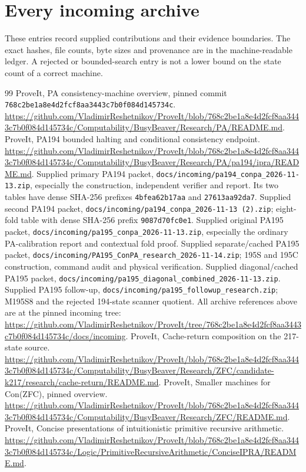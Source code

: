 \documentclass[11pt,letterpaper]{article}
\newcommand{\file}[1]{\texttt{\nolinkurl{#1}}}
\begin{document}
\clearpage

\label{app:guardreview}

\clearpage
\section{Every incoming archive}\label{app:ledger}
These entries record supplied contributions and their evidence boundaries.
The exact hashes, file counts, byte sizes and provenance are in the
machine-readable ledger. A rejected or bounded-search entry is not a
lower bound on the state count of a correct machine.
{\small}

\clearpage
\begin{thebibliography}{99}
 ProveIt, PA consistency-machine overview, pinned commit
\texttt{768c2be1a8e4d2fcf8aa3443c7b0f084d145734c}.
\url{https://github.com/VladimirReshetnikov/ProveIt/blob/768c2be1a8e4d2fcf8aa3443c7b0f084d145734c/Computability/BusyBeaver/Research/PA/README.md}.
 ProveIt, PA194 bounded halting and conditional consistency endpoint.
\url{https://github.com/VladimirReshetnikov/ProveIt/blob/768c2be1a8e4d2fcf8aa3443c7b0f084d145734c/Computability/BusyBeaver/Research/PA/pa194/ipra/README.md}.
 Supplied primary PA194 packet,
\file{docs/incoming/pa194_conpa_2026-11-13.zip}, especially the construction,
independent verifier and report. Its two tables have dense SHA-256 prefixes
\texttt{4bfea62b17aa} and \texttt{27613aa92da7}.
 Supplied second PA194 packet,
\file{docs/incoming/pa194_conpa_2026-11-13 (2).zip}; eight-fold table
with dense SHA-256 prefix \texttt{9087d70fc0e1}.
 Supplied original PA195 packet,
\file{docs/incoming/pa195_conpa_2026-11-13.zip}, especially the ordinary
PA-calibration report and contextual fold proof.
 Supplied separate/cached PA195 packet,
\file{docs/incoming/PA195_ConPA_research_2026-11-14.zip}; 195S and 195C
construction, command audit and physical verification.
 Supplied diagonal/cached PA195 packet,
\file{docs/incoming/pa195_diagonal_combined_2026-11-13.zip}.
 Supplied PA195 follow-up,
\file{docs/incoming/pa195_followup_research.zip}; M195S8 and the rejected
194-state scanner quotient.
 All archive references above are at the pinned incoming tree:
\url{https://github.com/VladimirReshetnikov/ProveIt/tree/768c2be1a8e4d2fcf8aa3443c7b0f084d145734c/docs/incoming}.
 ProveIt, Cache-return composition on the 217-state source.
\url{https://github.com/VladimirReshetnikov/ProveIt/blob/768c2be1a8e4d2fcf8aa3443c7b0f084d145734c/Computability/BusyBeaver/Research/ZFC/candidate-k217/research/cache-return/README.md}.
 ProveIt, Smaller machines for Con(ZFC), pinned overview.
\url{https://github.com/VladimirReshetnikov/ProveIt/blob/768c2be1a8e4d2fcf8aa3443c7b0f084d145734c/Computability/BusyBeaver/Research/ZFC/README.md}.
 ProveIt, Concise presentations of intuitionistic primitive recursive arithmetic.
\url{https://github.com/VladimirReshetnikov/ProveIt/blob/768c2be1a8e4d2fcf8aa3443c7b0f084d145734c/Logic/PrimitiveRecursiveArithmetic/ConciseIPRA/README.md}.
\end{thebibliography}
\end{document}
